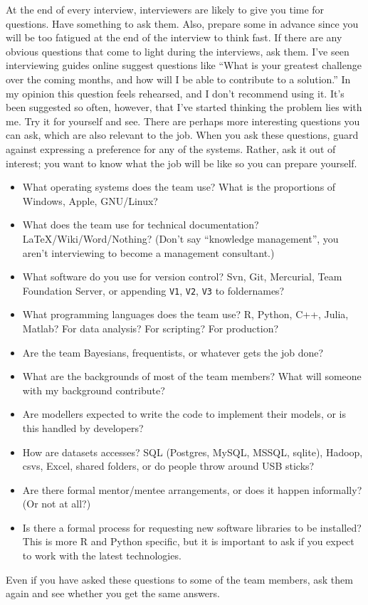 \documentclass[a4paper]{article}
\begin{document}
At the end of every interview, interviewers are likely to give you time for questions.
Have something to ask them.
Also, prepare some in advance since you will be too fatigued at the end of the interview to think fast.
If there are any obvious questions that come to light during the interviews, ask them.
I've seen interviewing guides online suggest questions like
``What is your greatest challenge over the coming months, and how will I be able to contribute to a solution.''
In my opinion this question feels rehearsed, and I don't recommend using it.
It's been suggested so often, however, that I've started thinking the problem lies with me.
Try it for yourself and see.
There are perhaps more interesting questions you can ask, which are also relevant to the job.
When you ask these questions, guard against expressing a preference for any of the systems. Rather, ask it out of interest; you want to know what the job will be like so you can prepare yourself.
\begin{itemize}
  \item What operating systems does the team use?
  What is the proportions of Windows, Apple, GNU/Linux?
  \item  What does the team use for technical documentation? LaTeX/Wiki/Word/Nothing? (Don't say ``knowledge management'', you aren't interviewing to become a management consultant.)
  \item  What software do you use for version control? Svn, Git, Mercurial, Team Foundation Server, or appending
  \verb+V1+,
  \verb+V2+,
  \verb+V3+
  to foldernames?
  \item  What programming languages does the team use? R, Python, C++, Julia, Matlab?
  For data analysis? For scripting? For production?
  \item  Are the team Bayesians, frequentists, or whatever gets the job done?
  \item  What are the backgrounds of most of the team members? What will someone with my background contribute?
  \item  Are modellers expected to write the code to implement their models, or is this handled by developers?
  \item  How are datasets accesses? SQL (Postgres, MySQL, MSSQL, sqlite), Hadoop, csvs, Excel, shared folders, or do people throw around USB sticks?
  \item  Are there formal mentor/mentee arrangements, or does it happen informally? (Or not at all?)
  \item  Is there a formal process for requesting new software libraries to be installed? This is more R and Python specific, but it is important to ask if you expect to work with the latest technologies.
\end{itemize}
Even if you have asked these questions to some of the team members, ask them again and see whether you get the same answers.
\end{document}

